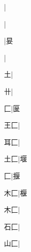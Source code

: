 \begin{multicols}{2}
{{\cjk{}{\cnsym{}　}{\cnsym{}　}{\cnsym{}　}}|{}\par
{}|{}\par
{\cjk{}{\cnsym{}　}{\cnsym{}　}{\cnsym{}　}}|{\cjk{}妟}\par
{\cjk{}{\cnsym{}　}{\cnsym{}　}{\cnsym{}　}}|{}\par
{\cjk{}{\cnsym{}　}{\cnsym{}　}土}|{}\par
{\cjk{}{\cnsym{}　}{\cnsym{}　}卄}|{}\par
{\cjk{}{\cnsym{}　}{\cnsym{}　}匚}|{\cjk{}匽}\par
{\cjk{}{\cnsym{}　}王匚}|{}\par
{\cjk{}{\cnsym{}　}耳匚}|{}\par
{\cjk{}{\cnsym{}　}土匚}|{\cjk{}堰}\par
{匚}|{\cjk{}揠}\par
{\cjk{}{\cnsym{}　}木匚}|{\cjk{}椻}\par
{\cjk{}{\cnsym{}　}木匚}|{}\par
{\cjk{}{\cnsym{}　}石匚}|{}\par
{\cjk{}{\cnsym{}　}山匚}|{}\par
}
\end{multicols}
